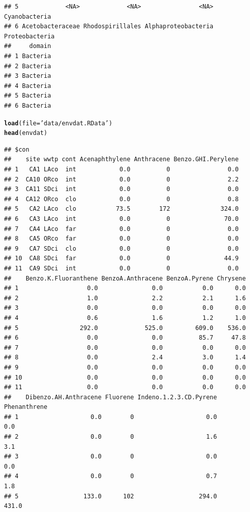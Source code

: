 \documentclass[letterpaper,12pt]{article}\usepackage[]{graphicx}\usepackage[]{color}
\makeatletter
\newcommand{\hlstr}[1]{\textcolor[rgb]{0.192,0.494,0.8}{#1}}%
\newcommand{\hlstd}[1]{\textcolor[rgb]{0.345,0.345,0.345}{#1}}%
\newcommand{\hlkwc}[1]{\textcolor[rgb]{0.333,0.667,0.333}{#1}}%
\newcommand{\hlkwd}[1]{\textcolor[rgb]{0.737,0.353,0.396}{\textbf{#1}}}%
\newenvironment{kframe}{%
 \def\at@end@of@kframe{}%
 \ifinner\ifhmode%
  \def\at@end@of@kframe{\end{minipage}}%
  \begin{minipage}{\columnwidth}%
 \fi\fi%
 \def\FrameCommand##1{\hskip\@totalleftmargin \hskip-\fboxsep
 \colorbox{shadecolor}{##1}\hskip-\fboxsep
     \hskip-\linewidth \hskip-\@totalleftmargin \hskip\columnwidth}%
 \MakeFramed {\advance\hsize-\width
   \@totalleftmargin\z@ \linewidth\hsize
   \@setminipage}}%
 {\par\unskip\endMakeFramed%
 \at@end@of@kframe}
\newenvironment{knitrout}{}{} %
\makeatother
\begin{document}
\begin{knitrout}
\begin{kframe}
\begin{verbatim}
## 5             <NA>             <NA>                <NA>  Cyanobacteria
## 6 Acetobacteraceae Rhodospirillales Alphaproteobacteria Proteobacteria
##     domain
## 1 Bacteria
## 2 Bacteria
## 3 Bacteria
## 4 Bacteria
## 5 Bacteria
## 6 Bacteria
\end{verbatim}
\begin{alltt}
\hlkwd{load}\hlstd{(}\hlkwc{file} \hlstd{=} \hlstr{'data/envdat.RData'}\hlstd{)}
\hlkwd{head}\hlstd{(envdat)}
\end{alltt}
\begin{verbatim}
## $con
##    site wwtp cont Acenaphthylene Anthracene Benzo.GHI.Perylene
## 1   CA1 LAco  int            0.0          0                0.0
## 2  CA10 ORco  int            0.0          0                2.2
## 3  CA11 SDci  int            0.0          0                0.0
## 4  CA12 ORco  clo            0.0          0                0.8
## 5   CA2 LAco  clo           73.5        172              324.0
## 6   CA3 LAco  int            0.0          0               70.0
## 7   CA4 LAco  far            0.0          0                0.0
## 8   CA5 ORco  far            0.0          0                0.0
## 9   CA7 SDci  clo            0.0          0                0.0
## 10  CA8 SDci  far            0.0          0               44.9
## 11  CA9 SDci  int            0.0          0                0.0
##    Benzo.K.Fluoranthene BenzoA.Anthracene BenzoA.Pyrene Chrysene
## 1                   0.0               0.0           0.0      0.0
## 2                   1.0               2.2           2.1      1.6
## 3                   0.0               0.0           0.0      0.0
## 4                   0.6               1.6           1.2      1.0
## 5                 292.0             525.0         609.0    536.0
## 6                   0.0               0.0          85.7     47.8
## 7                   0.0               0.0           0.0      0.0
## 8                   0.0               2.4           3.0      1.4
## 9                   0.0               0.0           0.0      0.0
## 10                  0.0               0.0           0.0      0.0
## 11                  0.0               0.0           0.0      0.0
##    Dibenzo.AH.Anthracene Fluorene Indeno.1.2.3.CD.Pyrene Phenanthrene
## 1                    0.0        0                    0.0          0.0
## 2                    0.0        0                    1.6          3.1
## 3                    0.0        0                    0.0          0.0
## 4                    0.0        0                    0.7          1.8
## 5                  133.0      102                  294.0        431.0

\end{verbatim}
\end{kframe}
\end{knitrout}
\end{document}
